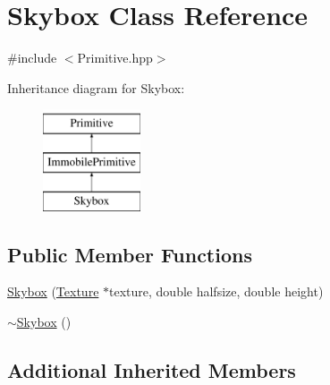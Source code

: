 \hypertarget{class_skybox}{\section{Skybox Class Reference}
\label{class_skybox}
}


{\ttfamily \#include $<$Primitive.\-hpp$>$}

Inheritance diagram for Skybox\-:\begin{figure}[H]
\begin{center}
\leavevmode
\includegraphics[height=3.000000cm]{class_skybox}
\end{center}
\end{figure}
\subsection*{Public Member Functions}
\begin{DoxyCompactItemize}
\item 
\hyperlink{class_skybox_afc61cfd31346170303119c316a2eb7f4}{Skybox} (\hyperlink{class_texture}{Texture} $\ast$texture, double halfsize, double height)
\item 
\hyperlink{class_skybox_a62ad4c6b4b1965a0a6d8536a50d4c090}{$\sim$\-Skybox} ()
\end{DoxyCompactItemize}
\subsection*{Additional Inherited Members}



